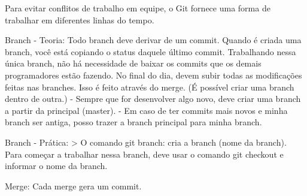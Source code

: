 Para evitar conflitos de trabalho em equipe, o Git fornece uma forma de trabalhar em diferentes linhas do tempo.

Branch - Teoria: Todo branch deve derivar de um commit. 
Quando é criada uma branch, você está copiando o status daquele último commit.
Trabalhando nessa única branch, não há necessidade de baixar os commits que os demais programadores estão fazendo.
No final do dia, devem subir todas as modificações feitas nas branches. Isso é feito através do merge.
(É possível criar uma branch dentro de outra.)
 - Sempre que for desenvolver algo novo, deve criar uma branch a partir da principal (master).
 - Em caso de ter commits mais novos e minha branch ser antiga, posso trazer a branch principal
   para minha branch.

Branch - Prática: 
> O comando git branch: cria a branch (nome da branch). Para começar a trabalhar nessa branch, deve usar o comando
git checkout e informar o nome da branch.

Merge: Cada merge gera um commit.